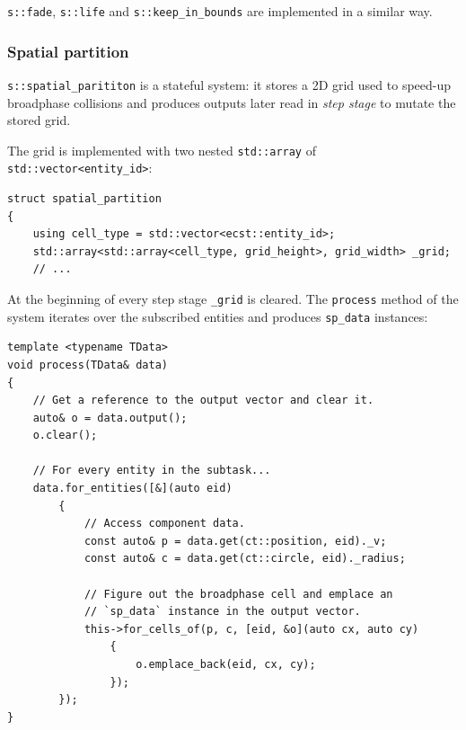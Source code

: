\documentclass[oneside, 12pt, a4paper, openany]{book}
\begin{document}
\texttt{s::fade},
\texttt{s::life}
and
\texttt{s::keep_in_bounds}
are implemented in a similar way.

\subsubsection{Spatial partition}\label{spatial-partition}

\texttt{s::spatial_parititon}
is a stateful system: it stores a 2D grid used to speed-up broadphase
collisions and produces outputs later read in \emph{step stage} to
mutate the stored grid.

The grid is implemented with two nested
\texttt{std::array}
of
\texttt{std::vector<entity_id>}:

\begin{verbatim}
struct spatial_partition
{
    using cell_type = std::vector<ecst::entity_id>;
    std::array<std::array<cell_type, grid_height>, grid_width> _grid;
    // ...
\end{verbatim}

At the beginning of every step stage
\texttt{_grid}
is cleared. The
\texttt{process}
method of the system iterates over the subscribed entities and produces
\texttt{sp_data}
instances:

\begin{verbatim}
template <typename TData>
void process(TData& data)
{
    // Get a reference to the output vector and clear it.
    auto& o = data.output();
    o.clear();

    // For every entity in the subtask...
    data.for_entities([&](auto eid)
        {
            // Access component data.
            const auto& p = data.get(ct::position, eid)._v;
            const auto& c = data.get(ct::circle, eid)._radius;

            // Figure out the broadphase cell and emplace an
            // `sp_data` instance in the output vector.
            this->for_cells_of(p, c, [eid, &o](auto cx, auto cy)
                {
                    o.emplace_back(eid, cx, cy);
                });
        });
}
\end{verbatim}
\end{document}
